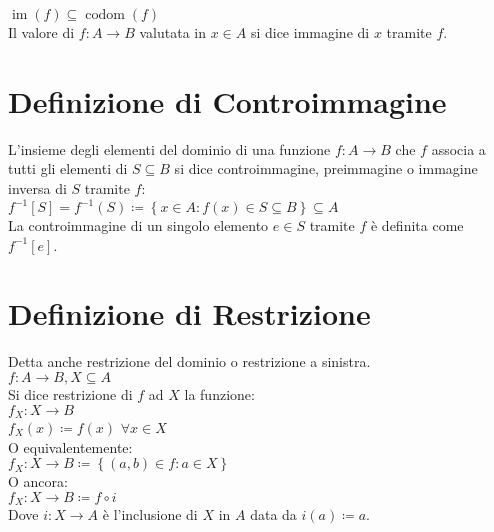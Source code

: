 \documentclass[a4paper, twoside, italian, 11pt]{book}
\newcommand{\braces}[1] {\left \{ #1 \right \}}
\DeclareMathOperator{\codom}{codom}
\DeclareMathOperator{\im}{im}
\begin{document}
\noindent
$\im(f) \subseteq \codom(f)$ \\

\noindent
Il valore di $f : A \rightarrow B$ valutata in $x \in A$ si dice immagine di $x$ tramite $f$.



\section{Definizione di Controimmagine}

L'insieme degli elementi del dominio di una funzione $f : A \rightarrow B$ che $f$ associa a tutti gli elementi di $S \subseteq B$ si dice controimmagine, preimmagine o immagine inversa di $S$ tramite $f$: \\

$f^{-1}[S] = f^{-1}(S) \coloneqq \braces{x \in A : f(x) \in S \subseteq B} \subseteq A$ \\

\noindent
La controimmagine di un singolo elemento $e \in S$ tramite $f$ è definita come $f^{-1}[{e}]$.



\section{Definizione di Restrizione}

Detta anche restrizione del dominio o restrizione a sinistra. \\

\noindent
$f : A \rightarrow B, X \subseteq A$ \\

\noindent
Si dice restrizione di $f$ ad $X$ la funzione: \\

$f_X : X \rightarrow B$ \\
\indent
$f_X(x) \coloneqq f(x)$ $\forall x \in X$ \\

\noindent
O equivalentemente: \\

$f_X : X \rightarrow B \coloneqq \braces{(a, b) \in f : a \in X}$ \\

\noindent
O ancora: \\

$f_X : X \rightarrow B \coloneqq f \circ i$ \\

\noindent
Dove $i : X \rightarrow A$ è l'inclusione di $X$ in $A$ data da $i(a) \coloneqq a$. \\
\end{document}
